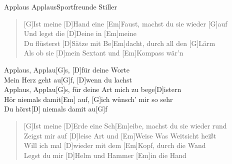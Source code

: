 \begin{song}{Applaus Applaus}{Sportfreunde Stiller}

    \begin{intro}
        [G D Em G D Em] 
    \end{intro}

    \begin{verse}  
        [G]Ist meine [D]Hand eine [Em]Faust, machst du sie wieder [G]auf \\
        Und legst die [D]Deine in [Em]meine \\
        [G]Du flüsterst [D]Sätze mit Be[Em]dacht, durch all den [G]Lärm \\
        Als ob sie [D]mein Sextant und [Em]Kompass wär'n
    \end{verse}  

    \begin{chorus}
        [C]Applaus, Applau[G]s, [D]für deine Worte \\
        [C]Mein Herz geht au[G]f, [D]wenn du lachst \\
        [C]Applaus, Applau[G]s, für deine Art mich zu bege[D]istern \\
        [C]Hör niemals damit[Em] auf, [G]ich wünsch' mir so sehr \\
        Du hörst[D] niemals damit au[G]f
    \end{chorus}

    \begin{interlude}
        [G D Em G D Em] 
    \end{interlude}

    \begin{verse}  
        [G]Ist meine [D]Erde eine Sch[Em]eibe, machst du sie wieder rund \\
        [G]Zeigst mir auf [D]leise Art und [Em]Weise Was Weitsicht heißt \\
        [G]Will ich mal [D]wieder mit dem [Em]Kopf, durch die Wand \\
        [G]Legst du mir [D]Helm und Hammer [Em]in die Hand
    \end{verse}  


\end{song}
